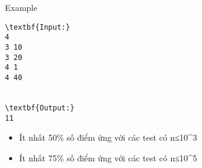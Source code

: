 Example
\begin{verbatim}
\textbf{Input:}
4
3 10
3 20
4 1
4 40


\textbf{Output:}
11 \end{verbatim}
\begin{itemize}
	\item     Ít nhất 50\% số điểm ứng với các test có n≤10^3   
	\item     Ít nhất 75\% số điểm ứng với các test có n≤10^5   
\end{itemize}